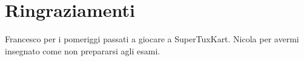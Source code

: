 \chapter*{Ringraziamenti}
Francesco per i pomeriggi passati a giocare a SuperTuxKart. 
Nicola per avermi insegnato come non prepararsi agli esami. 
